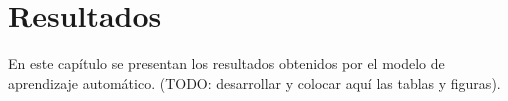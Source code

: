 
\chapter{Resultados}

\label{cap:resultados}

En este capítulo se presentan los resultados obtenidos por el modelo
de aprendizaje automático. (TODO: desarrollar y colocar aquí las tablas
y figuras).


